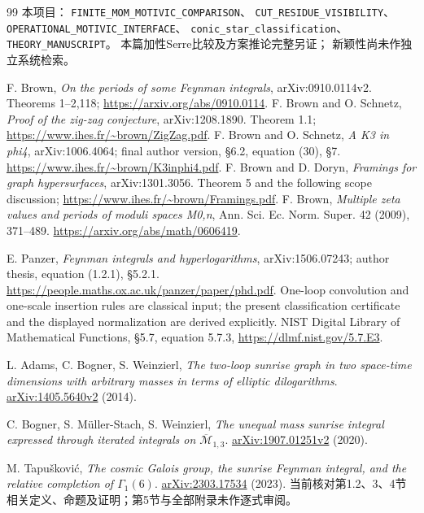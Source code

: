 \documentclass[11pt,a4paper]{ctexart}
\theoremstyle{cnplain}\newtheorem{theorem}{定理}[section]
\theoremstyle{definition}\newtheorem{definition}[theorem]{定义}
\theoremstyle{remark}\newtheorem{remark}[theorem]{注}
\begin{document}
\begin{thebibliography}{99}
 本项目：
\nolinkurl{FINITE_MOM_MOTIVIC_COMPARISON}、
\nolinkurl{CUT_RESIDUE_VISIBILITY}、
\nolinkurl{OPERATIONAL_MOTIVIC_INTERFACE}、
\nolinkurl{conic_star_classification}、
\nolinkurl{THEORY_MANUSCRIPT}。
本篇加性Serre比较及方案推论完整另证；
新颖性尚未作独立系统检索。

 F. Brown, \emph{On the periods of some Feynman integrals}, arXiv:0910.0114v2. Theorems 1--2,118; \url{https://arxiv.org/abs/0910.0114}.
 F. Brown and O. Schnetz, \emph{Proof of the zig-zag conjecture}, arXiv:1208.1890. Theorem 1.1; \url{https://www.ihes.fr/~brown/ZigZag.pdf}.
 F. Brown and O. Schnetz, \emph{A K3 in phi4}, arXiv:1006.4064; final author version, \S6.2, equation (30), \S7. \url{https://www.ihes.fr/~brown/K3inphi4.pdf}.
 F. Brown and D. Doryn, \emph{Framings for graph hypersurfaces}, arXiv:1301.3056. Theorem 5 and the following scope discussion; \url{https://www.ihes.fr/~brown/Framings.pdf}.
 F. Brown, \emph{Multiple zeta values and periods of moduli spaces M0,n}, Ann. Sci. Ec. Norm. Super. 42 (2009), 371--489. \url{https://arxiv.org/abs/math/0606419}.

 E. Panzer, \emph{Feynman integrals and hyperlogarithms},
arXiv:1506.07243; author thesis, equation (1.2.1), \S5.2.1.
\url{https://people.maths.ox.ac.uk/panzer/paper/phd.pdf}.
One-loop convolution and one-scale insertion rules are classical input; the present
classification certificate and the displayed normalization are derived explicitly.
 NIST Digital Library of Mathematical Functions, \S5.7, equation 5.7.3,
\url{https://dlmf.nist.gov/5.7.E3}.

 L. Adams, C. Bogner, S. Weinzierl,
\emph{The two-loop sunrise graph in two space-time dimensions with arbitrary masses in terms of elliptic dilogarithms}.
\href{https://arxiv.org/abs/1405.5640v2}{arXiv:1405.5640v2} (2014).

 C. Bogner, S. Müller-Stach, S. Weinzierl,
\emph{The unequal mass sunrise integral expressed through iterated integrals on
$\overline{\mathcal M}_{1,3}$}.
\href{https://arxiv.org/abs/1907.01251v2}{arXiv:1907.01251v2} (2020).

 M. Tapušković,
\emph{The cosmic Galois group, the sunrise Feynman integral, and the relative completion of $\Gamma_1(6)$}.
\href{https://arxiv.org/abs/2303.17534}{arXiv:2303.17534} (2023).
当前核对第1.2、3、4节相关定义、命题及证明；第5节与全部附录未作逐式审阅。


\end{thebibliography}
\end{document}
